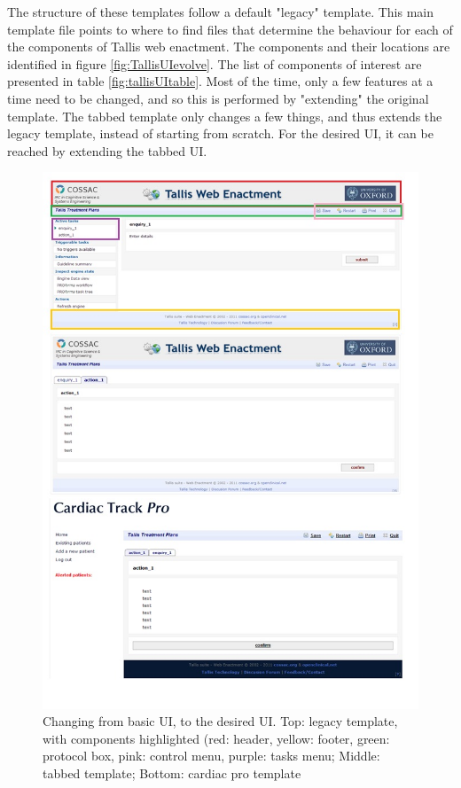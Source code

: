 \documentclass[11pt]{article}
\begin{document}
The structure of these templates follow a default "legacy" template.  This main template file points to where to find files that determine the behaviour for each of the components of Tallis web enactment.  The components and their locations are identified in figure \ref{fig:TallisUIevolve}. The list of components of interest are presented in table \ref{fig:tallisUItable}.  Most of the time, only a few features at a time need to be changed, and so this is performed by "extending" the original template.  The tabbed template only changes a few things, and thus extends the legacy template, instead of starting from scratch.  For the desired UI, it can be reached by extending the tabbed UI.
\begin{figure}[!p]
\begin{center}
\includegraphics[scale=0.8]{tallisUIevolve}
\caption{Changing from basic UI, to the desired UI. Top: legacy template, with components highlighted (red: header, yellow: footer, green: protocol box, pink: control menu, purple: tasks menu; Middle: tabbed template; Bottom: cardiac pro template }
\label{fig:tallisUIevolve}
\end{center}
\end{figure}
\end{document}
